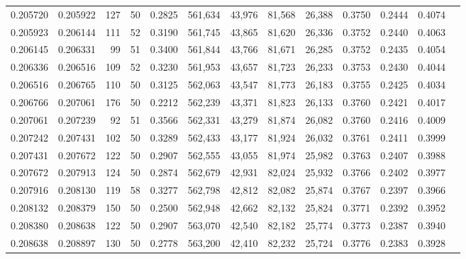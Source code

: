 \begin{tabular}{rrrrrrrrrrrrr}
0.205720 & 0.205922 &   127 &  50 &                                     0.2825 & 561,634 &  43,976 &  81,568 &  26,388 & 0.3750 & 0.2444 & 0.4074 \\
0.205923 & 0.206144 &   111 &  52 &                                     0.3190 & 561,745 &  43,865 &  81,620 &  26,336 & 0.3752 & 0.2440 & 0.4063 \\
0.206145 & 0.206331 &    99 &  51 &                                     0.3400 & 561,844 &  43,766 &  81,671 &  26,285 & 0.3752 & 0.2435 & 0.4054 \\
0.206336 & 0.206516 &   109 &  52 &                                     0.3230 & 561,953 &  43,657 &  81,723 &  26,233 & 0.3753 & 0.2430 & 0.4044 \\
0.206516 & 0.206765 &   110 &  50 &                                     0.3125 & 562,063 &  43,547 &  81,773 &  26,183 & 0.3755 & 0.2425 & 0.4034 \\
0.206766 & 0.207061 &   176 &  50 &                                     0.2212 & 562,239 &  43,371 &  81,823 &  26,133 & 0.3760 & 0.2421 & 0.4017 \\
0.207061 & 0.207239 &    92 &  51 &                                     0.3566 & 562,331 &  43,279 &  81,874 &  26,082 & 0.3760 & 0.2416 & 0.4009 \\
0.207242 & 0.207431 &   102 &  50 &                                     0.3289 & 562,433 &  43,177 &  81,924 &  26,032 & 0.3761 & 0.2411 & 0.3999 \\
0.207431 & 0.207672 &   122 &  50 &                                     0.2907 & 562,555 &  43,055 &  81,974 &  25,982 & 0.3763 & 0.2407 & 0.3988 \\
0.207672 & 0.207913 &   124 &  50 &                                     0.2874 & 562,679 &  42,931 &  82,024 &  25,932 & 0.3766 & 0.2402 & 0.3977 \\
0.207916 & 0.208130 &   119 &  58 &                                     0.3277 & 562,798 &  42,812 &  82,082 &  25,874 & 0.3767 & 0.2397 & 0.3966 \\
0.208132 & 0.208379 &   150 &  50 &                                     0.2500 & 562,948 &  42,662 &  82,132 &  25,824 & 0.3771 & 0.2392 & 0.3952 \\
0.208380 & 0.208638 &   122 &  50 &                                     0.2907 & 563,070 &  42,540 &  82,182 &  25,774 & 0.3773 & 0.2387 & 0.3940 \\
0.208638 & 0.208897 &   130 &  50 &                                     0.2778 & 563,200 &  42,410 &  82,232 &  25,724 & 0.3776 & 0.2383 & 0.3928 \\

\end{tabular}
